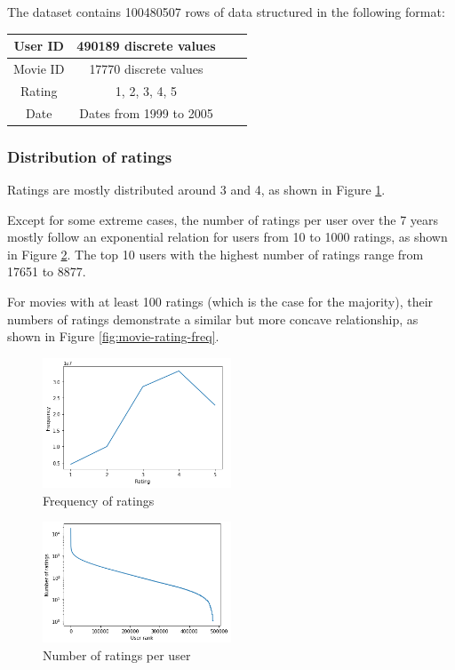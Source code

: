 \documentclass[final]{cvpr}
\begin{document}
The dataset contains 100480507 rows of data structured in the following format:

\begin{tabular}{|c|c|c|c|}
	\hline
	User ID & 490189 discrete values \\ \hline
	Movie ID & 17770 discrete values \\ \hline
	Rating & 1, 2, 3, 4, 5 \\ \hline
	Date & Dates from 1999 to 2005 \\ \hline
\end{tabular}

\subsubsection{Distribution of ratings}
Ratings are mostly distributed around 3 and 4,
as shown in Figure \ref{fig:rating-freq}.

Except for some extreme cases, the number of ratings per user over the 7 years
mostly follow an exponential relation for users from 10 to 1000 ratings,
as shown in Figure \ref{fig:user-rating-freq}.
The top 10 users with the highest number of ratings
range from 17651 to 8877.

For movies with at least 100 ratings (which is the case for the majority),
their numbers of ratings demonstrate a similar but more concave relationship,
as shown in Figure \ref{fig:movie-rating-freq}.

\begin{figure}
	\includegraphics[width=0.5\textwidth]{screenshot20210422222105.png}
	\caption{Frequency of ratings}
	\label{fig:rating-freq}
\end{figure}

\begin{figure}
	\includegraphics[width=0.5\textwidth]{screenshot20210422222340.png}
	\caption{Number of ratings per user}
	\label{fig:user-rating-freq}
\end{figure}
\end{document}
